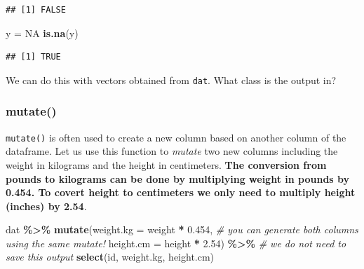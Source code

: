 \documentclass[
]{book}
\newenvironment{Shaded}{\begin{snugshade}}{\end{snugshade}}
\newcommand{\AttributeTok}[1]{\textcolor[rgb]{0.13,0.29,0.53}{#1}}
\newcommand{\CommentTok}[1]{\textcolor[rgb]{0.56,0.35,0.01}{\textit{#1}}}
\newcommand{\ConstantTok}[1]{\textcolor[rgb]{0.56,0.35,0.01}{#1}}
\newcommand{\FloatTok}[1]{\textcolor[rgb]{0.00,0.00,0.81}{#1}}
\newcommand{\FunctionTok}[1]{\textcolor[rgb]{0.13,0.29,0.53}{\textbf{#1}}}
\newcommand{\NormalTok}[1]{#1}
\newcommand{\OtherTok}[1]{\textcolor[rgb]{0.56,0.35,0.01}{#1}}
\newcommand{\SpecialCharTok}[1]{\textcolor[rgb]{0.81,0.36,0.00}{\textbf{#1}}}
\begin{document}
\begin{verbatim}
## [1] FALSE
\end{verbatim}

\begin{Shaded}
\begin{Highlighting}[]
\NormalTok{y }\OtherTok{=} \ConstantTok{NA}
\FunctionTok{is.na}\NormalTok{(y)}
\end{Highlighting}
\end{Shaded}

\begin{verbatim}
## [1] TRUE
\end{verbatim}

We can do this with vectors obtained from \texttt{dat}. What class is the output in?

\begin{Shaded}
\end{Shaded}

\hypertarget{mutate}{%
\subsubsection{mutate()}\label{mutate}}

\texttt{mutate()} is often used to create a new column based on another column of the dataframe. Let us use this function to \emph{mutate} two new columns including the weight in kilograms and the height in centimeters. \textbf{The conversion from pounds to kilograms can be done by multiplying weight in pounds by 0.454. To covert height to centimeters we only need to multiply height (inches) by 2.54}.

\begin{Shaded}
\begin{Highlighting}[]
\NormalTok{dat }\SpecialCharTok{\%\textgreater{}\%}
  \FunctionTok{mutate}\NormalTok{(}\AttributeTok{weight.kg =}\NormalTok{ weight }\SpecialCharTok{*} \FloatTok{0.454}\NormalTok{,        }\CommentTok{\# you can generate both columns using the same mutate!}
         \AttributeTok{height.cm =}\NormalTok{ height }\SpecialCharTok{*} \FloatTok{2.54}\NormalTok{) }\SpecialCharTok{\%\textgreater{}\%}     \CommentTok{\# we do not need to save this output}
  \FunctionTok{select}\NormalTok{(id, weight.kg, height.cm)}
\end{Highlighting}
\end{Shaded}
\end{document}
